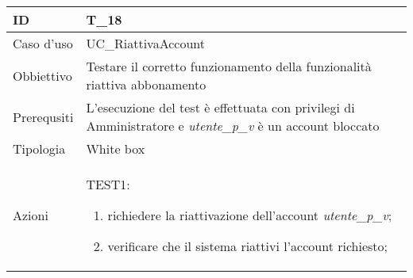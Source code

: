 \begin{table}[hb]
    \centering
    \begin{tabular}{ |p{2cm}|p{10cm}|  }
        \hline
        ID          & T\_18                                                                                                       \\\hline
        Caso d'uso  & UC\_RiattivaAccount                                                                                         \\\hline
        Obbiettivo  & Testare il corretto funzionamento della funzionalità riattiva abbonamento                                   \\\hline
        Prerequsiti & L'esecuzione del test è effettuata con privilegi di Amministratore e \emph{utente\_p\_v} è un account bloccato \\\hline
        Tipologia   & White box                                                                                                   \\\hline
        Azioni      &
        TEST1:
        \begin{enumerate}[nosep, topsep=0pt]
            \item richiedere la riattivazione dell'account \emph{utente\_p\_v};
            \item verificare che il sistema riattivi l'account richiesto;
        \end{enumerate}
        \\\hline
    \end{tabular}
\end{table}

